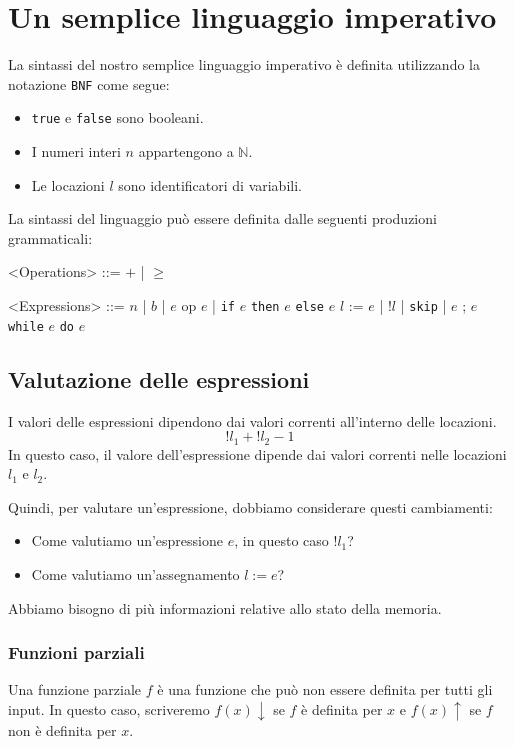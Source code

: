 \chapter{Un semplice linguaggio imperativo}
La sintassi del nostro semplice linguaggio imperativo è definita utilizzando
la notazione \texttt{BNF} come segue:

\begin{itemize}
    \item \texttt{true} e \texttt{false} sono booleani.
    \item I numeri interi $n$ appartengono a $\mathbb{N}$.
    \item Le locazioni $l$ sono identificatori di variabili.
  \end{itemize}
  La sintassi del linguaggio può essere definita dalle seguenti produzioni grammaticali:
  
\begin{grammar}
    <Operations> ::= $+$ | $\geq$
    
    <Expressions>  ::= $n$ | $b$ | $e$ op $e$ | \texttt{if} $e$ \texttt{then} $e$ \texttt{else} $e$ \alt 
    $l$ := $e$ | !$l$ | \texttt{skip} | $e$ ; $e$ 
    \alt \texttt{while} $e$ \texttt{do} $e$
\end{grammar}
\section{Valutazione delle espressioni}
I valori delle espressioni dipendono dai valori correnti all'interno 
delle locazioni.
\[
  !l_1 + !l_2 - 1
\] 
In questo caso, il valore dell'espressione dipende dai valori correnti nelle 
locazioni $l_1$ e $l_2$.

Quindi, per valutare un'espressione, dobbiamo considerare questi cambiamenti:
\begin{itemize}
  \item Come valutiamo un'espressione $e$, in questo caso $!l_1$?
  \item Come valutiamo un'assegnamento $l := e$?
\end{itemize}
Abbiamo bisogno di più informazioni relative allo stato della memoria.
\subsection{Funzioni parziali}
Una funzione parziale $f$ è una funzione che può non essere definita per
tutti gli input. In questo caso, scriveremo $f(x) \downarrow$ se $f$ è definita
per $x$ e $f(x) \uparrow$ se $f$ non è definita per $x$.

